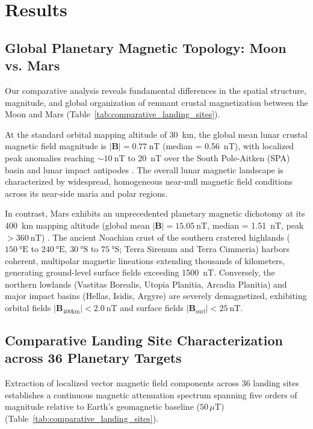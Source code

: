 \section{Results}
\label{sec:results}

\subsection{Global Planetary Magnetic Topology: Moon vs. Mars}
Our comparative analysis reveals fundamental differences in the spatial structure, magnitude, and global organization of remnant crustal magnetization between the Moon and Mars (Table~\ref{tab:comparative_landing_sites}).

At the standard orbital mapping altitude of \SI{30}{\kilo\meter}, the global mean lunar crustal magnetic field magnitude is $|\mathbf{B}| = \SI{0.77}{\nano\tesla}$ (median = \SI{0.56}{\nano\tesla}), with localized peak anomalies reaching $\sim\SI{10}{\nano\tesla}$ to \SI{20}{\nano\tesla} over the South Pole-Aitken (SPA) basin and lunar impact antipodes \citep{Hood2020, Tsunakawa2015}. The overall lunar magnetic landscape is characterized by widespread, homogeneous near-null magnetic field conditions across its near-side maria and polar regions.

In contrast, Mars exhibits an unprecedented planetary magnetic dichotomy at its \SI{400}{\kilo\meter} mapping altitude (global mean $|\mathbf{B}| = \SI{15.05}{\nano\tesla}$, median = \SI{1.51}{\nano\tesla}, peak $> \SI{360}{\nano\tesla}$) \citep{Langlais2019}. The ancient Noachian crust of the southern cratered highlands ($\SI{150}{\degree}\text{E}$ to $\SI{240}{\degree}\text{E}$, $\SI{30}{\degree}\text{S}$ to $\SI{75}{\degree}\text{S}$; Terra Sirenum and Terra Cimmeria) harbors coherent, multipolar magnetic lineations extending thousands of kilometers, generating ground-level surface fields exceeding \SI{1500}{\nano\tesla}. Conversely, the northern lowlands (Vastitas Borealis, Utopia Planitia, Arcadia Planitia) and major impact basins (Hellas, Isidis, Argyre) are severely demagnetized, exhibiting orbital fields $|\mathbf{B}_{\text{400km}}| < \SI{2.0}{\nano\tesla}$ and surface fields $|\mathbf{B}_{\text{surf}}| < \SI{25}{\nano\tesla}$.

\subsection{Comparative Landing Site Characterization across 36 Planetary Targets}
Extraction of localized vector magnetic field components across 36 landing sites establishes a continuous magnetic attenuation spectrum spanning five orders of magnitude relative to Earth's geomagnetic baseline ($50\,\mu\text{T}$) (Table~\ref{tab:comparative_landing_sites}).

